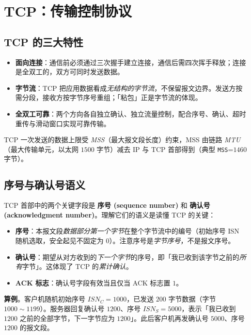 \section{TCP：传输控制协议}

\subsection{TCP 的三大特性}

\begin{itemize}
    \item \textbf{面向连接}：通信前必须通过三次握手建立连接，通信后需四次挥手释放；连接是全双工的，双方可同时发送数据。
    \item \textbf{字节流}：TCP 把应用数据看成\emph{无结构的字节流}，不保留报文边界。发送方按需分段，接收方按字节序号重组；「粘包」正是字节流的体现。
    \item \textbf{全双工可靠}：两个方向各自独立确认、独立流量控制，配合序号、确认、超时重传与滑动窗口实现可靠传输。
\end{itemize}

TCP 一次发送的数据上限受 \emph{MSS}（最大报文段长度）约束，MSS 由链路 \emph{MTU}（最大传输单元，以太网 $1500$ 字节）减去 IP 与 TCP 首部得到（典型 \texttt{MSS}=$1460$ 字节）。

\subsection{序号与确认号语义}

TCP 首部中的两个关键字段是 \textbf{序号 (sequence number)} 和 \textbf{确认号 (acknowledgment number)}。理解它们的语义是读懂 TCP 的关键：

\begin{itemize}
    \item \textbf{序号}：本报文段\emph{数据部分第一个字节}在整个字节流中的编号（初始序号 ISN 随机选取，安全起见不固定为 $0$）。注意序号是\emph{字节序号}，不是报文序号。
    \item \textbf{确认号}：期望从对方收到的\emph{下一个字节}的序号，即「我已收到该字节之前的\emph{所有}字节」。这体现了 TCP 的\emph{累计确认}。
    \item \textbf{ACK 标志}：确认号字段有效当且仅当 ACK 标志置 $1$。
\end{itemize}

\textbf{算例}。客户机随机初始序号 $ISN_C = 1000$，已发送 $200$ 字节数据（字节 $1000\sim1199$）。服务器回复确认号 $1200$、序号 $ISN_S = 5000$，表示「我已收到 $1200$ 之前的全部字节，下一字节应为 $1200$」。此后客户机再发确认号 $5000$、序号 $1200$ 的报文段。

